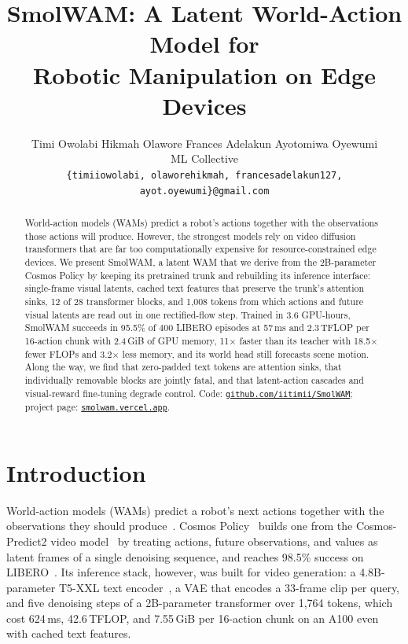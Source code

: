 \documentclass{article}
\title{SmolWAM: A Latent World-Action Model for\\Robotic Manipulation on Edge Devices}
\author{%
  Timi Owolabi \quad Hikmah Olawore \quad Frances Adelakun \quad Ayotomiwa Oyewumi\\
  ML Collective\\
  \texttt{\{timiiowolabi, olaworehikmah, francesadelakun127, ayot.oyewumi\}@gmail.com}
}
\newcommand{\smol}{SmolWAM\xspace}
\newcommand{\cosmos}{Cosmos Policy\xspace}
\begin{document}
\maketitle

\begin{abstract}
World-action models (WAMs) predict a robot's actions together with the observations those actions will produce. However, the strongest models rely on video diffusion transformers that are far too computationally expensive for resource-constrained edge devices.
We present \smol, a latent WAM that we derive from the 2B-parameter \cosmos by keeping its pretrained trunk and rebuilding its inference interface: single-frame visual latents, cached text features that preserve the trunk's attention sinks, 12 of 28 transformer blocks, and 1,008 tokens from which actions and future visual latents are read out in one rectified-flow step.
Trained in 3.6 GPU-hours, \smol succeeds in 95.5\% of 400 LIBERO episodes at 57\,ms and 2.3\,TFLOP per 16-action chunk with 2.4\,GiB of GPU memory, 11$\times$ faster than its teacher with 18.5$\times$ fewer FLOPs and 3.2$\times$ less memory, and its world head still forecasts scene motion.
Along the way, we find that zero-padded text tokens are attention sinks, that individually removable blocks are jointly fatal, and that latent-action cascades and visual-reward fine-tuning degrade control.
Code: \href{https://github.com/iitimii/SmolWAM}{\texttt{github.com/iitimii/SmolWAM}}; project page: \href{https://smolwam.vercel.app/}{\texttt{smolwam.vercel.app}}.
\end{abstract}

\section{Introduction}
\label{sec:intro}

World-action models (WAMs) predict a robot's next actions together with the observations they should produce~\citep{kim2026cosmospolicy,ye2026dreamzero,lu2026wamsurvey}.
\cosmos~\citep{kim2026cosmospolicy} builds one from the Cosmos-Predict2 video model~\citep{nvidia2025cosmos} by treating actions, future observations, and values as latent frames of a single denoising sequence, and reaches 98.5\% success on LIBERO~\citep{liu2023libero}.
Its inference stack, however, was built for video generation: a 4.8B-parameter T5-XXL text encoder~\citep{raffel2020t5}, a VAE that encodes a 33-frame clip per query, and five denoising steps of a 2B-parameter transformer over 1,764 tokens, which cost 624\,ms, 42.6\,TFLOP, and 7.55\,GiB per 16-action chunk on an A100 even with cached text features.
\end{document}

